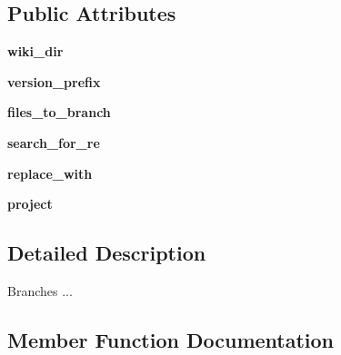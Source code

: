 \subsection*{Public Attributes}
\begin{DoxyCompactItemize}
\item 
\mbox{\label{classrelease__docs_1_1_wiki_brancher_ad86478c9538ac0bf3916f67eb5da2910}} 
{\bfseries wiki\+\_\+dir}
\item 
\mbox{\label{classrelease__docs_1_1_wiki_brancher_aae330aeef850b105795c5d75727448ba}} 
{\bfseries version\+\_\+prefix}
\item 
\mbox{\label{classrelease__docs_1_1_wiki_brancher_a938c78ba6e8adfb6af039dd500ac6466}} 
{\bfseries files\+\_\+to\+\_\+branch}
\item 
\mbox{\label{classrelease__docs_1_1_wiki_brancher_a029ce9007fefd6ac5f13bacdedb29af5}} 
{\bfseries search\+\_\+for\+\_\+re}
\item 
\mbox{\label{classrelease__docs_1_1_wiki_brancher_aa33d991e629cc94fbfefe4f8569e283e}} 
{\bfseries replace\+\_\+with}
\item 
\mbox{\label{classrelease__docs_1_1_wiki_brancher_a4ac9c796f95690cca04049b557055443}} 
{\bfseries project}
\end{DoxyCompactItemize}


\subsection{Detailed Description}
\begin{DoxyVerb}Branches ...\end{DoxyVerb}
 

\subsection{Member Function Documentation}
\mbox{\label{classrelease__docs_1_1_wiki_brancher_a05fc4282f501fb0210ecb33fd1d209a6}} 
